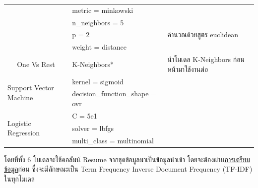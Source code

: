 \begin{table}[H]
\begin{tabularx}{\textwidth}{|l|l|X|X|}
                                                                     &                                 & metric = minkowski       &                                    \\ \cline{3-4}
                                                                     &                                 & n\_neighbors = 5         &                                    \\ \cline{3-4}
                                                                     &                                 & p = 2                    & คำนวณด้วยสูตร euclidean               \\ \cline{3-4}
                                                                     &                                 & weight = distance        &                                    \\  \cline{2-4}
                                                                     & One Vs Rest                     & K-Neighbors*             & นำโมเดล K-Neighbors ก่อนหน้ามาใช้งานต่อ \\ \hline
        \multicolumn{2}{|l|}{\multirow{2}{*}{Support Vector Machine}} & kernel = sigmoid                &                                                               \\ \cline{3-4}
        \multicolumn{2}{|l|}{}                                        & decision\_function\_shape = ovr &                                                               \\ \hline
        \multicolumn{2}{|l|}{\multirow{3}{*}{Logistic Regression}}    & C = 5e1                         &                                                               \\ \cline{3-4}
        \multicolumn{2}{|l|}{}                                        & solver = lbfgs                  &                                                               \\ \cline{3-4}
        \multicolumn{2}{|l|}{}                                        & multi\_class = multinomial      &                                                               \\ \hline
    \end{tabularx}
\end{table}

โดยที่ทั้ง 6 โมเดลจะใช้คอลัมน์ Resume จากชุดข้อมูลมาเป็นข้อมูลนำเข้า โดยจะต้องผ่าน\hyperref[subsec:Data Preparation]{การเตรียมข้อมูล}ก่อน ซึ่งจะมีลักษณะเป็น
Term Frequency Inverse Document Frequency (TF-IDF) ในทุกโมเดล

